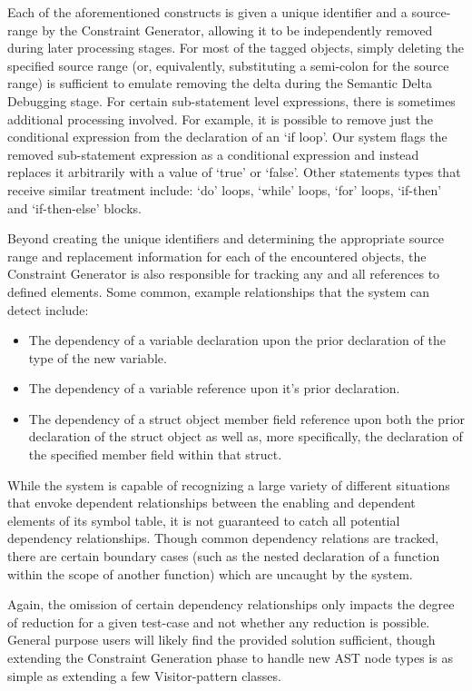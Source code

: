 \documentclass[preprint]{acm_proc_article-sp}
\begin{document}
Each of the aforementioned constructs is given a unique identifier and a source-
range by the Constraint Generator, allowing it to be independently removed
during later processing stages. For most of the tagged objects, simply deleting
the specified source range (or, equivalently, substituting a semi-colon for the
source range) is sufficient to emulate removing the delta during the Semantic
Delta Debugging stage. For certain sub-statement level expressions, there is
sometimes additional processing involved. For example, it is possible to remove
just the conditional expression from the declaration of an `if loop'. Our system
flags the removed sub-statement expression as a conditional expression and
instead replaces it arbitrarily with a value of `true' or `false'. Other
statements types that receive similar treatment include: `do' loops, `while'
loops, `for' loops, `if-then' and `if-then-else' blocks.

Beyond creating the unique identifiers and determining the appropriate source
range and replacement information for each of the encountered objects, the
Constraint Generator is also responsible for tracking any and all references to
defined elements. Some common, example relationships that the system can detect
include:

\begin{itemize}

\item The dependency of a variable declaration upon the prior declaration of the
      type of the new variable.
\item The dependency of a variable reference upon it's prior declaration.
\item The dependency of a struct object member field reference upon both the
      prior declaration of the struct object as well as, more specifically, the
      declaration of the specified member field within that struct.

\end{itemize}

While the system is capable of recognizing a large variety of different
situations that envoke dependent relationships between the enabling and
dependent elements of its symbol table, it is not guaranteed to catch all
potential dependency relationships. Though common dependency relations are
tracked, there are certain boundary cases (such as the nested declaration of a
function within the scope of another function) which are uncaught by the system.

Again, the omission of certain dependency relationships only impacts the degree
of reduction for a given test-case and not whether any reduction is possible.
General purpose users will likely find the provided solution sufficient, though
extending the Constraint Generation phase to handle new AST node types is as
simple as extending a few Visitor-pattern classes.
\end{document}
